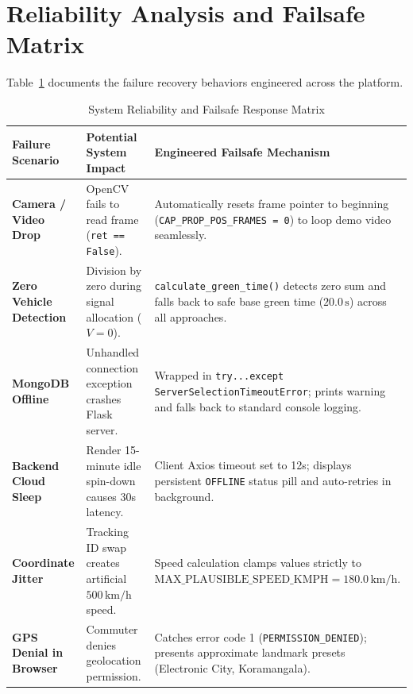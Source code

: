 \section{Reliability Analysis and Failsafe Matrix}
Table~\ref{tab:failsafe_matrix} documents the failure recovery behaviors engineered across the platform.

\begin{table}[h!]
\centering
\small
\begin{tabularx}{\textwidth}{p{3.8cm} p{4.2cm} X}
\toprule
\textbf{Failure Scenario} & \textbf{Potential System Impact} & \textbf{Engineered Failsafe Mechanism} \\
\midrule
\textbf{Camera / Video Drop} & OpenCV fails to read frame (\texttt{ret == False}). & Automatically resets frame pointer to beginning (\texttt{CAP\_PROP\_POS\_FRAMES = 0}) to loop demo video seamlessly. \\
\textbf{Zero Vehicle Detection} & Division by zero during signal allocation ($V = 0$). & \texttt{calculate\_green\_time()} detects zero sum and falls back to safe base green time ($20.0\,\text{s}$) across all approaches. \\
\textbf{MongoDB Offline} & Unhandled connection exception crashes Flask server. & Wrapped in \texttt{try...except ServerSelectionTimeoutError}; prints warning and falls back to standard console logging. \\
\textbf{Backend Cloud Sleep} & Render 15-minute idle spin-down causes 30s latency. & Client Axios timeout set to 12s; displays persistent \texttt{OFFLINE} status pill and auto-retries in background. \\
\textbf{Coordinate Jitter} & Tracking ID swap creates artificial $500\,\text{km/h}$ speed. & Speed calculation clamps values strictly to $\text{MAX\_PLAUSIBLE\_SPEED\_KMPH} = 180.0\,\text{km/h}$. \\
\textbf{GPS Denial in Browser} & Commuter denies geolocation permission. & Catches error code 1 (\texttt{PERMISSION\_DENIED}); presents approximate landmark presets (Electronic City, Koramangala). \\
\bottomrule
\end{tabularx}
\caption{System Reliability and Failsafe Response Matrix}
\label{tab:failsafe_matrix}
\end{table}
